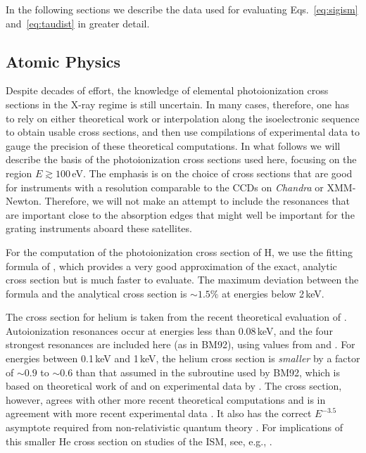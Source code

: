 \documentclass{aastex}
\begin{document}
In the following sections we describe the data used for evaluating
Eqs.~\eqref{eq:sigism} and~\eqref{eq:taudist} in greater detail.

\subsection{Atomic Physics}\label{sec:atomic}
Despite decades of effort, the knowledge of elemental
photoionization cross sections in the X-ray regime is still 
uncertain. In many cases, therefore, one has to rely on either
theoretical work or interpolation along the isoelectronic
sequence to obtain usable cross sections, and then use
compilations of experimental data to gauge the precision of these
theoretical computations. In what follows we will describe the basis
of the photoionization cross sections used here, focusing on the 
region $E \gtrsim 100$\,eV. The emphasis is on
the choice of cross sections that are good for instruments with a
resolution comparable to the CCDs on \textsl{Chandra} or
XMM-Newton. Therefore, we will not make an attempt to include the
resonances that are important close to the absorption edges that might
well be important for the grating instruments aboard these
satellites. 

For the computation of the photoionization cross section of H, we
use the fitting formula of \citet{band:90a}, which provides a
very good approximation of the exact, analytic cross section but
is much faster to evaluate. The maximum deviation between the
\citet{band:90a} formula and the analytical cross section
\citep[e.g.,][eq.~71.7, divided by two]{bethe:57a} is $\sim
1.5\%$ at energies below 2\,keV.

The cross section for helium is taken from the recent theoretical
evaluation of \citet{yan:98a}.  Autoionization resonances
occur at energies less than 0.08\,keV, and the four strongest 
resonances are included here (as in BM92),
using values from \citet{oza:86a} and \citet{fernley:87a}.
For energies between 0.1\,keV and 1\,keV, the helium cross
section is \emph{smaller} by a factor of $\sim 0.9$ to $\sim 0.6$
than that assumed in the subroutine used by BM92, which is based
on theoretical work of \citet{chen:91b} and on experimental data
by \citet{marr:76a}.  The \citet{yan:98a} cross section, however,
agrees with other more recent theoretical computations
\citep[e.g., those of][]{verner:95a} and is in agreement with
more recent experimental data \citep[][and references
therein]{yan:98a}.  It also has the correct $E^{-3.5}$ asymptote
required from non-relativistic quantum theory \citep{bethe:57a}.
For implications of this smaller He cross section on studies of
the ISM, see, e.g., \citet{arabadjis:99a}.
\end{document}
